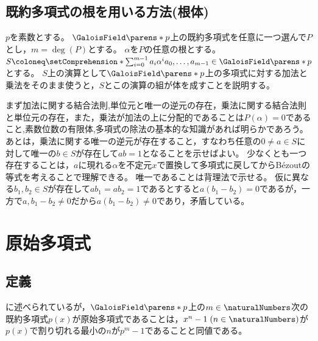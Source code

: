         \subsection{既約多項式の根を用いる方法(根体)}
            $p$を素数とする。
            $\GaloisField\parens*{p}$上の既約多項式を任意に一つ選んで$P$とし，$m = \deg(P)$とする。
            $\alpha$を$P$の任意の根とする。
            $S \coloneq \setComprehension*{\sum_{i=0}^{m-1}a_i\alpha^i}{a_0,\dotsc,a_{m-1} \in \GaloisField\parens*{p}}$とする。
            $S$上の演算として$\GaloisField\parens*{p}$上の多項式に対する加法と乗法をそのまま使うと，$S$とこの演算の組が体を成すことを説明する。
            \par
            まず加法に関する結合法則,単位元と唯一の逆元の存在，乗法に関する結合法則と単位元の存在，また，乗法が加法の上に分配的であることは$P(\alpha) = 0$であること,素数位数の有限体,多項式の除法の基本的な知識があれば明らかであろう。
            あとは，乗法に関する唯一の逆元が存在すること，すなわち任意の$0 \neq a\in S$に対して唯一の$b\in S$が存在して$ab=1$となることを示せばよい。
            少なくとも一つ存在することは，$a$に現れる$\alpha$を不定元$x$で置換して多項式に戻してからB\'ezoutの等式を考えることで理解できる。
            唯一であることは背理法で示せる。
            仮に異なる$b_1,b_2 \in S$が存在して$ab_1 = ab_2 = 1$であるとすると$a(b_1 - b_2) = 0$であるが，一方で$a, b_1 - b_2 \neq 0$だから$a(b_1 - b_2) \neq 0$であり，矛盾している。
    \section{原始多項式}
        \subsection{定義}
            \cite{prim_poly_Wikipedia}に述べられているが，$\GaloisField\parens*{p}$上の$m\in\naturalNumbers$次の既約多項式$p(x)$が原始多項式であることは，$x^n-1\;(n\in\naturalNumbers)$が$p(x)$で割り切れる最小の$n$が$p^m-1$であることと同値である。
